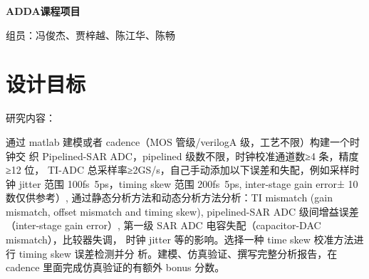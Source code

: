 \documentclass[cs4size,a4paper]{ctexart}
\numberwithin{equation}{section}
\numberwithin{table}{section}
\numberwithin{figure}{section}
\begin{document}
\newtheorem{example}{例}              %
\newtheorem{algorithm}{算法}
\newtheorem{theorem}{定理}            %
\newtheorem{definition}{定义}
\newtheorem{axiom}{公理}
\newtheorem{property}{性质}
\newtheorem{proposition}{命题}
\newtheorem{lemma}{引理}
\newtheorem{corollary}{推论}
\newtheorem{remark}{注解}
\newtheorem{condition}{条件}
\newtheorem{conclusion}{结论}
\newtheorem{assumption}{假设}
\renewcommand{\contentsname}{目录}     
\renewcommand{\abstractname}{摘要} 
\renewcommand{\refname}{参考文献}     
\renewcommand{\indexname}{索引}
\renewcommand{\figurename}{图}
\renewcommand{\tablename}{表}
\renewcommand{\appendixname}{附录}
\renewcommand{\proofname}{证明}
\renewcommand{\algorithm}{算法} 
% 
\pagestyle{plain}
% 
\pagestyle{empty}
\pagestyle{plain}
% 
% 
% 
% 
% 

\begin{center}
    \textsc{ \bfseries ADDA课程项目}\\[0.3cm]
\end{center}

\begin{center}
	组员：冯俊杰、贾梓越、陈江华、陈畅
\end{center}

\newpage
\tableofcontents

\newpage
\section{设计目标}
\noindent
研究内容：

通过 matlab 建模或者 cadence（MOS 管级/verilogA 级，工艺不限）构建一个时钟交
织 Pipelined-SAR ADC，pipelined 级数不限，时钟校准通道数≥4 条，精度≥12 位，
TI-ADC 总采样率≥2GS/s，自己手动添加以下误差和失配，例如采样时钟 jitter 范围
100fs~5ps，timing skew 范围 200fs~5ps, inter-stage gain error± 10%
数仅供参考）, 通过静态分析方法和动态分析方法分析：TI mismatch (gain mismatch,
offset mismatch and timing skew), pipelined-SAR ADC 级间增益误差（inter-stage 
gain error）, 第一级 SAR ADC 电容失配（capacitor-DAC mismatch），比较器失调，
时钟 jitter 等的影响。选择一种 time skew 校准方法进行 timing skew 误差检测并分
析。建模、仿真验证、撰写完整分析报告，在 cadence 里面完成仿真验证的有额外 bonus
分数。
\end{document}
